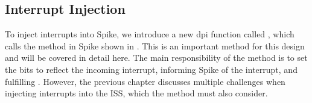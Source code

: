 %
%
%
%
%
%
%

\subsection{Interrupt Injection}%
\label{sec:iss_interruptInjection}

To inject interrupts into Spike, we introduce a new \acrshort{dpi} function called , which calls the  method in Spike shown in . This is an important method for this design and will be covered in detail here.
The main responsibility of the method is to set the  bits to reflect the incoming interrupt, informing Spike of the interrupt, and fulfilling . However, the previous chapter discusses multiple challenges when injecting interrupts into the ISS, which the method must also consider.

